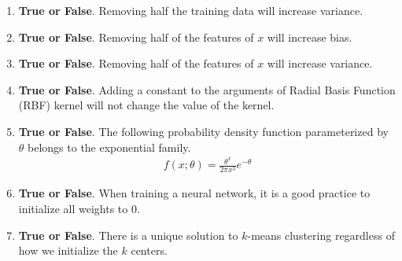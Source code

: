 \documentclass{article}
\newif\ifsolutions
\newenvironment{labelledanswer}{{\bf Answer:} \sf }{}%
\newcommand{\answer}[2]
{{
\ifsolutions
\begin{labelledanswer}
\color{red} 
#2
\end{labelledanswer}
\else
#1
\fi
}}
\begin{document}
\begin{enumerate}

\item \textbf{True or False}. Removing half the training data will increase variance.

\answer{}{True, this should mean that the model will have less to work with for prediction. The test prediction will likely be larger than before, indicating incrase variance.}

\item \textbf{True or False}. Removing half of the features of $x$ will increase bias.

\answer{}{True, this would increase bias since it forces the model to assume more with less information available.}

\item \textbf{True or False}. Removing half of the features of $x$ will increase variance.

\answer{}{False, removing features leads to increase in bias, which could lead to decrease in variance. }

\item \textbf{True or False}. Adding a constant to the arguments of Radial Basis Function (RBF) kernel will not change the value of the kernel.

\answer{}{True, since RBF kernels rely on calculating squared distance. This squared distance would be unchanged as $((x+c) - (x'+c))^2 = ((x - x')^2 = $.}

\item \textbf{True or False}. The following probability density function parameterized by $\theta$ belongs to the exponential family.
\begin{align}
f(x;\theta) = \frac{\theta^x}{2\pi x^3}e^{-\theta}
\end{align}

\answer{}{False, $\theta^x$ is problematic here.}

\item \textbf{True or False}. When training a neural network, it is a good practice to initialize all weights to $0$.

\answer{}{False, we need random initialization. The reason is discussed in "Parameters Initialization" in Deep Learning Notes, but essentially to avoid the same output for first layer.}

\item \textbf{True or False}. There is a unique solution to $k$-means clustering regardless of how we initialize the $k$ centers. 

\answer{}{False, depending on how we initialize the $k$ centers, it'll impact the distance calculation to determine which group an examples belong to. This can in turn result in a different $k$-means solution as we run the algorithm each time through the same dataset.}

\end{enumerate}
\end{document}
